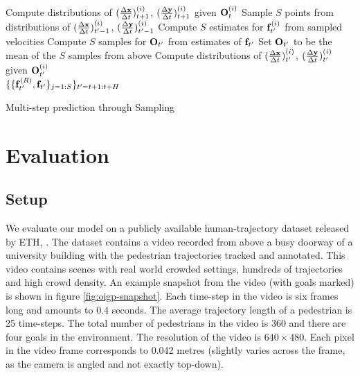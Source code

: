 \begin{algorithm}[h]
  \begin{algorithmic}[1]
     \State Compute distributions of
    $(\frac{\Delta \mathbf{x}}{\Delta t})_{t+1}^{(i)}$, $(\frac{\Delta \mathbf{y}}{\Delta t})_{t+1}^{(i)}$ given
    $\mathbf{O}^{(i)}_t$\label{alg:line:start}
    \EndFor
      \State Sample $S$
    points from distributions of $(\frac{\Delta \mathbf{x}}{\Delta t})_{t'-1}^{(i)}$,
    $(\frac{\Delta \mathbf{y}}{\Delta t})_{t'-1}^{(i)}$\label{alg:line:sample} \State Compute $S$
    estimates for $\mathbf{f}^{(i)}_{t'}$ from sampled
    velocities\label{alg:line:estimate}
    \EndFor
    \State Compute $S$ samples for $\mathbf{O}_{t'}$ from estimates of
    $\mathbf{f}_{t'}$\label{alg:line:estimateocc} \State Set $\mathbf{O}_{t'}$
    to be the mean of the $S$ samples from above \label{alg:line:mean}
     \State Compute distributions of
    $(\frac{\Delta \mathbf{x}}{\Delta t})_{t'}^{(i)}$, $(\frac{\Delta \mathbf{y}}{\Delta t})_{t'}^{(i)}$ given
    $\mathbf{O}^{(i)}_{t'}$\label{alg:line:repeat}
    \EndFor
    \EndFor \\
    \Return
    $\{\{\mathbf{f}^{(R)}_{t'},
    \mathbf{f}_{t'}\}_{j=1:S}\}_{t'=t+1:t+H}$\label{alg:line:return}
  \end{algorithmic}
  \caption{Multi-step prediction through Sampling}
  \label{alg:oigp-sampling}
\end{algorithm}



\section{Evaluation}
\label{sec:oigp-evaluation}

\subsection{Setup}
\label{sec:oigp-setup}

We evaluate our model on a publicly available human-trajectory dataset
released by ETH, \cite{pellegrini09}.
%
%
%
%
The dataset contains a video recorded from above a busy doorway of a
university building with the pedestrian trajectories tracked and
annotated.  This video contains scenes with real world crowded
settings, hundreds of trajectories and high crowd density.
%
%
%
%
%
An example snapshot from the video (with goals marked) is shown in
figure \ref{fig:oigp-snapshot}. Each time-step in the video is six frames
long and amounts to 0.4 seconds. The average trajectory length of a
pedestrian is 25 time-steps. The total number of pedestrians in the
video is 360 and there are four goals in the environment. The
resolution of the video is $640 \times 480$. Each pixel in the video
frame corresponds to 0.042 metres (slightly varies across the frame,
as the camera is angled and not exactly top-down).

